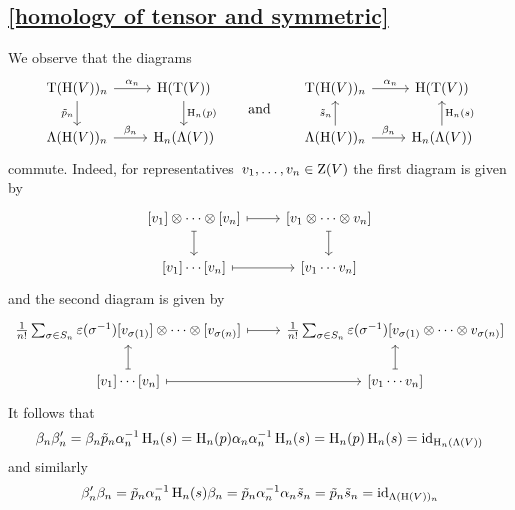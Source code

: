\documentclass[a4paper,10pt,headings=standardclasses]{scrartcl}
\begin{document}
\subsection{\cref{homology of tensor and symmetric}}
\label{homology of tensor and symmetric proof}

We observe that the diagrams
\[
  \begin{tikzcd}
    \dgTensor(\homology(V))_n
    \arrow{r}[above]{\alpha_n}
    \arrow{d}[left]{\tilde{p}_n}
    &
    \homology(\Tensor(V))
    \arrow{d}[right]{\homology_n(p)}
    \\
    \dgSymm(\homology(V))_n
    \arrow{r}[above]{\beta_n}
    &
    \homology_n(\dgSymm(V))
  \end{tikzcd}
  \qquad\text{and}\qquad
  \begin{tikzcd}
    \dgTensor(\homology(V))_n
    \arrow{r}[above]{\alpha_n}
    &
    \homology(\Tensor(V))
    \\
    \dgSymm(\homology(V))_n
    \arrow{u}[left]{\tilde{s}_n}
    \arrow{r}[above]{\beta_n}
    &
    \homology_n(\dgSymm(V))
    \arrow{u}[right]{\homology_n(s)}
  \end{tikzcd}
\]
commute.
Indeed, for representatives~$v_1, \dotsc, v_n \in \operatorname{Z}(V)$ the first diagram is given by
\[
  \begin{tikzcd}
    {[v_1]} \tensor \dotsb \tensor {[v_n]}
    \arrow[mapsto]{r}
    \arrow[mapsto]{d}
    &
    {[v_1 \tensor \dotsb \tensor v_n]}
    \arrow[mapsto]{d}
    \\
    {[v_1]} \dotsm {[v_n]}
    \arrow[mapsto]{r}
    &
    {[v_1 \dotsm v_n]}
  \end{tikzcd}
\]
and the second diagram is given by
\[
  \begin{tikzcd}
    \frac{1}{n!} \sum_{\sigma \in S_n} \varepsilon(\sigma^{-1})
    {[v_{\sigma(1)}]} \tensor \dotsb \tensor {[v_{\sigma(n)}]}
    \arrow[mapsto]{r}
    &
    \frac{1}{n!} \sum_{\sigma \in S_n} \varepsilon(\sigma^{-1})
    {[v_{\sigma(1)} \tensor \dotsb \tensor v_{\sigma(n)}]}
    \\
    {[v_1]} \dotsm {[v_n]}
    \arrow[mapsto]{u}
    \arrow[mapsto]{r}
    &
    {[v_1 \dotsm v_n]}
    \arrow[mapsto]{u}
  \end{tikzcd}
\]
It follows that
\[
  \beta_n \beta'_n
  =
  \beta_n \tilde{p}_n \alpha_n^{-1} \operatorname{H}_n(s)
  =
  \operatorname{H}_n(p) \alpha_n \alpha_n^{-1} \operatorname{H}_n(s)
  =
  \operatorname{H}_n(p) \operatorname{H}_n(s)
  =
  \operatorname{id}_{\operatorname{H}_n(\operatorname{\Lambda}(V))}
\]
and similarly
\[
  \beta'_n \beta_n
  =
  \tilde{p}_n \alpha_n^{-1} \operatorname{H}_n(s) \beta_n
  =
  \tilde{p}_n \alpha_n^{-1} \alpha_n \tilde{s}_n
  =
  \tilde{p}_n \tilde{s}_n
  =
  \operatorname{id}_{\operatorname{\Lambda}(\operatorname{H}(V))_n}
\]
\end{document}

